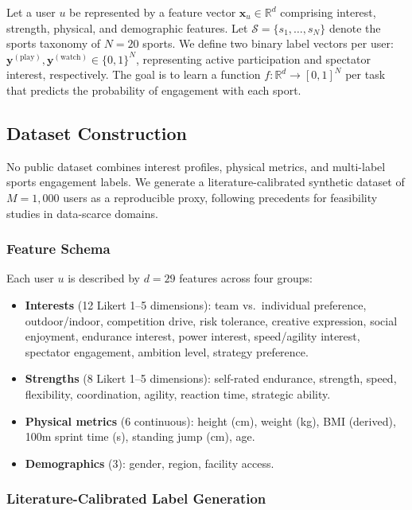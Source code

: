 \documentclass[conference]{IEEEtran}
\begin{document}
Let a user $u$ be represented by a feature vector $\mathbf{x}_u \in \mathbb{R}^d$
comprising interest, strength, physical, and demographic features.
Let $\mathcal{S} = \{s_1, \ldots, s_N\}$ denote the sports taxonomy of $N = 20$ sports.
We define two binary label vectors per user:
$\mathbf{y}^{(\text{play})}, \mathbf{y}^{(\text{watch})} \in \{0,1\}^N$,
representing active participation and spectator interest, respectively.
The goal is to learn a function $f: \mathbb{R}^d \to [0,1]^{N}$ per task that
predicts the probability of engagement with each sport.

\subsection{Dataset Construction}

No public dataset combines interest profiles, physical metrics, and
multi-label sports engagement labels.
We generate a literature-calibrated synthetic dataset of $M = 1{,}000$ users
as a reproducible proxy, following precedents for feasibility studies in
data-scarce domains.

\subsubsection{Feature Schema}

Each user $u$ is described by $d = 29$ features across four groups:

\begin{itemize}
  \item \textbf{Interests} (12 Likert 1--5 dimensions): team vs.\ individual
    preference, outdoor/indoor, competition drive, risk tolerance, creative
    expression, social enjoyment, endurance interest, power interest,
    speed/agility interest, spectator engagement, ambition level, strategy
    preference.
  \item \textbf{Strengths} (8 Likert 1--5 dimensions): self-rated endurance,
    strength, speed, flexibility, coordination, agility, reaction time,
    strategic ability.
  \item \textbf{Physical metrics} (6 continuous): height (cm), weight (kg),
    BMI (derived), 100m sprint time (s), standing jump (cm), age.
  \item \textbf{Demographics} (3): gender, region, facility access.
\end{itemize}

\subsubsection{Literature-Calibrated Label Generation}
\end{document}
